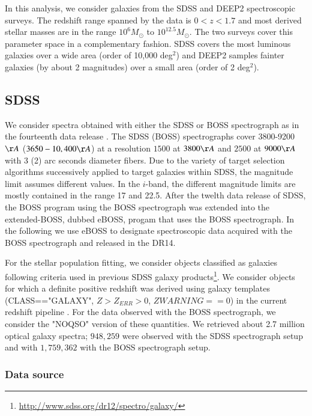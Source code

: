 \documentclass[onecolumn]{aa}
\begin{document}
In this analysis, we consider galaxies from the SDSS and DEEP2 spectroscopic surveys. 
The redshift range spanned by the data is $0<z<1.7$ and most derived stellar masses are in the range $10^6 M_\odot$ to $10^{12.5} M_\odot$. 
The two surveys cover this parameter space in a complementary fashion. 
SDSS covers the most luminous galaxies over a wide area (order of 10,000 deg$^2$) and DEEP2 samples fainter galaxies (by about 2 magnitudes) over a small area (order of 2 deg$^2$). 
%
\subsection{SDSS}
We consider spectra obtained with either the SDSS or BOSS spectrograph \citep{2006AJ....131.2332G,Smee2013} as in the fourteenth data release \citep{dawson_2016,blanton_2017,SDSS_DR14}. 
The SDSS (BOSS) spectrographs cover 3800-9200$\AA$ ($3650-10,400\AA$) at a resolution $1500$ at $3800\AA$ and $2500$ at $9000\AA$ with 3 (2) arc seconds diameter fibers.
Due to the variety of target selection algorithms successively applied to target galaxies within SDSS, the magnitude limit assumes different values. In the $i$-band, the different magnitude limits are mostly contained in the range 17 and 22.5. 
After the twelth data release of SDSS, the BOSS program using the BOSS spectrograph was extended into the extended-BOSS, dubbed eBOSS, progam that uses the BOSS spectrograph. 
In the following we use eBOSS to designate spectroscopic data acquired with the BOSS spectrograph and released in the DR14.

For the stellar population fitting, we consider objects classified as galaxies following criteria used in previous SDSS galaxy products\footnote{\url{http://www.sdss.org/dr12/spectro/galaxy/}}.
We consider objects for which a definite positive redshift was derived using galaxy templates 
(CLASS=="GALAXY", $Z>Z_{ERR}>0$, $ZWARNING==0$) in the current redshift pipeline \citep[][version v5\_10\_0]{2012AJ....144..144B}. 
For the data observed with the BOSS spectrograph, we consider the "NOQSO" version of these quantities. 
We retrieved about 2.7 million optical galaxy spectra; $948,259$ were observed with the SDSS spectrograph setup and with $1,759,362$ with the BOSS spectrograph setup.%

\subsubsection*{Data source}
\end{document}
